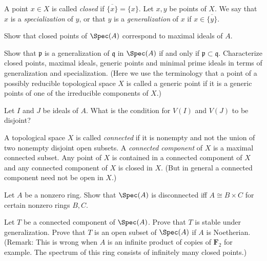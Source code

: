 \begin{definition}
\label{definition-closed}
A point $x\in X$ is called {\it closed} if $\overline{\{x\}} = \{ x\}$.
Let $x, y$ be points of $X$. We say that $x$ is a {\it specialization}
of $y$, or that $y$ is a {\it generalization} of $x$ if
$x\in \overline{\{y\}}$.
\end{definition}

\begin{exercise}
\label{exercise-closed-maximal}
Show that closed points of $\Spec(A)$
correspond to maximal ideals of $A$.
\end{exercise}

\begin{exercise}
\label{exercise-generalization}
Show that ${\mathfrak p}$ is a generalization of ${\mathfrak q}$
in $\Spec(A)$ if and only if ${\mathfrak p}\subset {\mathfrak q}$.
Characterize closed points,
maximal ideals, generic points and minimal prime ideals in terms of
generalization and specialization. (Here we use the terminology that a point
of a possibly reducible topological space $X$ is called a generic point
if it is a generic points of one of the irreducible components of $X$.)
\end{exercise}

\begin{exercise}
\label{exercise-disjoint-closed-spec}
Let $I$ and $J$ be ideals of $A$.
What is the condition for $V(I)$ and $V(J)$ to be disjoint?
\end{exercise}

\begin{definition}
\label{definition-connected-component}
A topological space $X$ is called {\it connected} if it is nonempty and not the
union of two nonempty disjoint open subsets. A {\it connected component}
of $X$ is a maximal connected subset. Any point of $X$ is contained
in a connected component of $X$ and any connected component of $X$ is
closed in $X$. (But in general a connected component need not be open in $X$.)
\end{definition}

\begin{exercise}
\label{exercise-disconnected-spec}
Let $A$ be a nonzero ring.
Show that $\Spec(A)$ is disconnected
iff $A\cong B \times C$ for certain nonzero rings $B, C$.
\end{exercise}

\begin{exercise}
\label{exercise-connected-component-stable-generalization}
Let $T$ be a connected component
of $\Spec(A)$. Prove that $T$ is stable under generalization.
Prove that $T$ is an open subset of $\Spec(A)$ if $A$ is Noetherian.
(Remark: This is wrong when $A$ is an infinite product of copies of
${\mathbf F}_2$ for example. The spectrum of this ring consists of infinitely
many closed points.)
\end{exercise}

